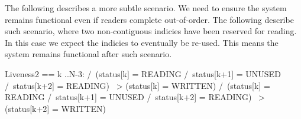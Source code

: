 The following describes a more subtle scenario. We need to ensure the system
remains functional even if readers complete out-of-order. The following describe
such scenario, where two non-contiguous indicies have been reserved for reading.
In this case we expect the indicies to eventually be re-used. This means the
system remains functional after such scenario.\newline

\begin{tla}
Liveness2 == 
    \A k ..N-3:
    /\ (status[k] = READING /\ status[k+1] = UNUSED /\ status[k+2] = READING) 
        ~> (status[k] = WRITTEN)
    /\ (status[k] = READING /\ status[k+1] = UNUSED /\ status[k+2] = READING) 
        ~> (status[k+2] = WRITTEN)
\end{tla}
\begin{tlatex}
%
%
%
%
\end{tlatex}

% 
